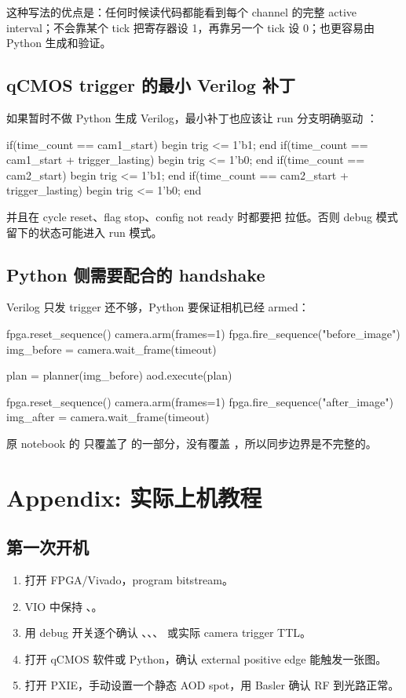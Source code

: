 \documentclass[11pt,oneside,openany]{book}
\begin{document}
这种写法的优点是：任何时候读代码都能看到每个 channel 的完整 active interval；不会靠某个 tick 把寄存器设 1，再靠另一个 tick 设 0；也更容易由 Python 生成和验证。

\section{qCMOS trigger 的最小 Verilog 补丁}
如果暂时不做 Python 生成 Verilog，最小补丁也应该让 run 分支明确驱动 ：
\begin{codeblock}
if(time_count == cam1_start) begin
    trig <= 1'b1;
end
if(time_count == cam1_start + trigger_lasting) begin
    trig <= 1'b0;
end
if(time_count == cam2_start) begin
    trig <= 1'b1;
end
if(time_count == cam2_start + trigger_lasting) begin
    trig <= 1'b0;
end
\end{codeblock}

并且在 cycle reset、flag stop、config not ready 时都要把  拉低。否则 debug 模式留下的状态可能进入 run 模式。

\section{Python 侧需要配合的 handshake}
Verilog 只发 trigger 还不够，Python 要保证相机已经 armed：
\begin{codeblock}
fpga.reset_sequence()
camera.arm(frames=1)
fpga.fire_sequence("before_image")
img_before = camera.wait_frame(timeout)

plan = planner(img_before)
aod.execute(plan)

fpga.reset_sequence()
camera.arm(frames=1)
fpga.fire_sequence("after_image")
img_after = camera.wait_frame(timeout)
\end{codeblock}

原 notebook 的  只覆盖了  的一部分，没有覆盖 ，所以同步边界是不完整的。

\chapter{Appendix: 实际上机教程}
\section{第一次开机}
\begin{enumerate}
  \item 打开 FPGA/Vivado，program  bitstream。
  \item VIO 中保持 、。
  \item 用 debug 开关逐个确认 、、、 或实际 camera trigger TTL。
  \item 打开 qCMOS 软件或 Python，确认 external positive edge 能触发一张图。
  \item 打开 PXIE，手动设置一个静态 AOD spot，用 Basler 确认 RF 到光路正常。
\end{enumerate}
\end{document}
